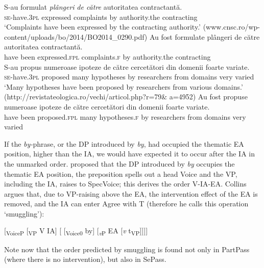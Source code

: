 \documentclass[output=paper]{langsci/langscibook}
\begin{document}
\ea%
    \label{ex:giurgea:29}
    \begin{xlista}[m'.]
    \ex
    \gll  S-au             {formulat} \emph{plângeri}     \emph{de către} autoritatea     contractantă.\\
          \textsc{se-}have.\textsc{3pl} expressed complaints by          authority.the contracting\\
    \glt  ‘Complaints have been expressed by the contracting authority.’ (www.cnsc.ro/wp-content/uploads/bo/2014/BO2014\_0290.pdf)
    \gll Au   fost  formulate        plângeri          {de către} autoritatea    contractantă.\\
         have been expressed.\textsc{fpl} complaints.\textsc{f} by          authority.the contracting\\
    \ex
    \gll S-au           propus    numeroase ipoteze {de către} cercetători din domenii foarte variate.\\
         \textsc{se-}have.\textsc{3pl} proposed many        hypotheses by    researchers from domains very varied\\
    \glt ‘Many hypotheses have been proposed by researchers from various domains.’ (http://revistateologica.ro/vechi/articol.php?r=79\& a=4952)
    \gll Au  fost    propuse   numeroase ipoteze      {de către} cercetători din domenii foarte variate.\\
         have been proposed.\textsc{fpl} many hypotheses.\textsc{f} by    researchers from domains very varied\\
    \end{xlista}
\z    

If the \textit{by-}phrase, or the DP introduced by \textit{by}, had occupied the thematic EA position, higher than the IA, we would have expected it to occur after the IA in the unmarked order. \citet{Collins2005} proposed that the DP introduced by \textit{by} occupies the thematic EA position, the preposition spells out a head Voice and the VP, including the IA, raises to SpecVoice; this derives the order V-IA-EA. Collins argues that, due to VP-raising above the EA, the intervention effect of the EA is removed, and the IA can enter Agree with T (therefore he calls this operation ‘smuggling'):

\ea%
    \label{ex:giurgea:30}
    [\textsubscript{VoiceP}  [\textsubscript{VP} V IA] [ [\textsubscript{Voice0}  by] [\textit{\textsubscript{v}}\textsubscript{P} EA [\textit{v} t\textsubscript{VP}]]]]
    \z

Note now that the order predicted by smuggling is found not only in PartPass (where there is no intervention), but also in SePass. 
\end{document}
